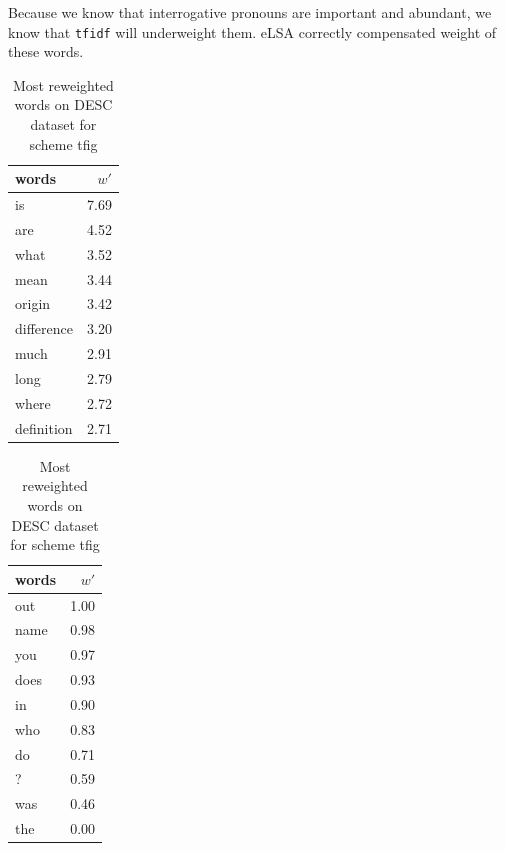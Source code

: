     Because we know that interrogative pronouns are important and abundant, we know that \texttt{tfidf} will underweight them.
    eLSA correctly compensated weight of these words.
    
    

\begin{table}[H]
    \centering
    \begin{minipage}{.4\linewidth}
      \centering
        \begin{tabular}{lr}
\toprule
      words &  $w'$ \\
\midrule
         is &  7.69 \\
        are &  4.52 \\
       what &  3.52 \\
       mean &  3.44 \\
     origin &  3.42 \\
 difference &  3.20 \\
       much &  2.91 \\
       long &  2.79 \\
      where &  2.72 \\
 definition &  2.71 \\
\bottomrule
\end{tabular}

    \end{minipage}
    \begin{minipage}{.4\linewidth}
      \centering
        \begin{tabular}{lr}
\toprule
words &  $w'$ \\
\midrule
  out &  1.00 \\
 name &  0.98 \\
  you &  0.97 \\
 does &  0.93 \\
   in &  0.90 \\
  who &  0.83 \\
   do &  0.71 \\
    ? &  0.59 \\
  was &  0.46 \\
  the &  0.00 \\
\bottomrule
\end{tabular}

    \end{minipage} 
    \caption{Most reweighted words on DESC dataset for scheme tfig}
    \label{tab:words:TREC:tfig}
\end{table}

